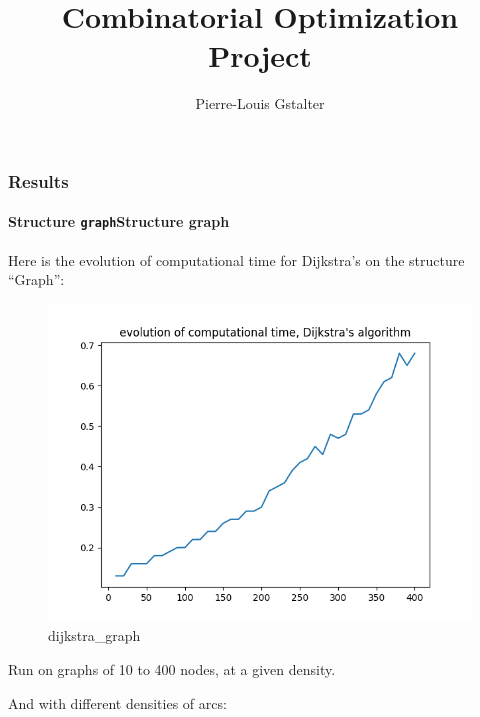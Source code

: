 \documentclass{article}
\title{Combinatorial Optimization Project}
\author{Pierre-Louis Gstalter}
\begin{document}
\maketitle

\tableofcontents
\newpage

\subsubsection{Results}

\paragraph{{Structure
\texttt{graph}}{Structure graph}}

Here is the evolution of computational time for Dijkstra's on the
structure ``Graph'':

\begin{figure}
\centering
\includegraphics{ressources/dijkstra_res_graph.png}
\caption{dijkstra\_graph}
\end{figure}

Run on graphs of 10 to 400 nodes, at a given density.

And with different densities of arcs:
\end{document}
